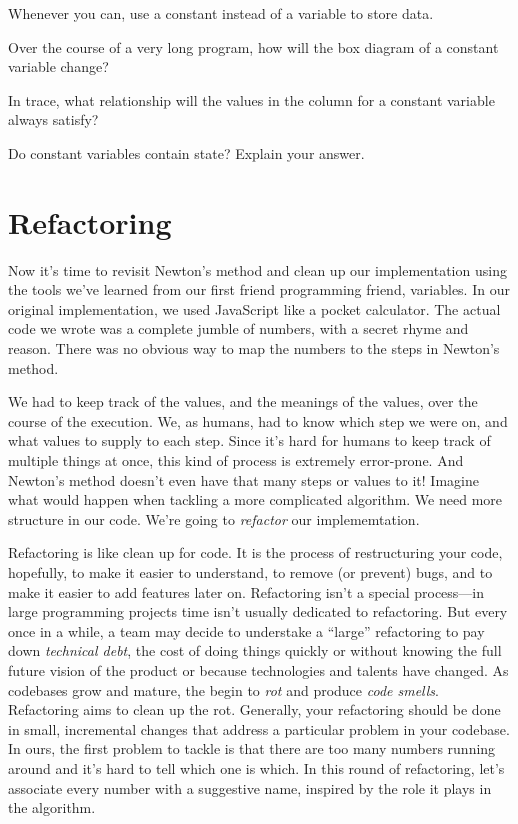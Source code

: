 \begin{center}
  Whenever you can, use a constant instead of a variable to store data.
\end{center}

\begin{question}
  Over the course of a very long program, how will the box diagram of a constant variable change?
\end{question}

\begin{question}
  In trace, what relationship will the values in the column for a constant variable always satisfy?
\end{question}

\begin{question}
  Do constant variables contain state? Explain your answer.
\end{question}

\section{Refactoring}
Now it's time to revisit Newton's method and clean up our implementation using the tools we've learned from our first friend programming friend, variables. In our original implementation, we used JavaScript like a pocket calculator. The actual code we wrote was a complete jumble of numbers, with a secret rhyme and reason. There was no obvious way to map the numbers to the steps in Newton's method.

We had to keep track of the values, and the meanings of the values, over the course of the execution. We, as humans, had to know which step we were on, and what values to supply to each step. Since it's hard for humans to keep track of multiple things at once, this kind of process is extremely error-prone. And Newton's method doesn't even have that many steps or values to it! Imagine what would happen when tackling a more complicated algorithm. We need more structure in our code. We're going to \emph{refactor} our implememtation.

Refactoring is like clean up for code. It is the process of restructuring your code, hopefully, to make it easier to understand, to remove (or prevent) bugs, and to make it easier to add features later on. Refactoring isn't a special process---in large programming projects time isn't usually dedicated to refactoring. But every once in a while, a team may decide to understake a ``large'' refactoring to pay down \emph{technical debt}, the cost of doing things quickly or without knowing the full future vision of the product or because technologies and talents have changed. As codebases grow and mature, the begin to \emph{rot} and produce \emph{code smells}. Refactoring aims to clean up the rot.
Generally, your refactoring should be done in small, incremental changes that address a particular problem in your codebase. In ours, the first problem to tackle is that there are too many numbers running around and it's hard to tell which one is which. In this round of refactoring, let's associate every number with a suggestive name, inspired by the role it plays in the algorithm.


